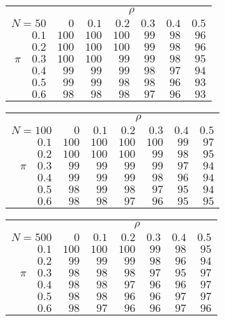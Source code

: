 \begin{tabular}{r|rrrrrr}
\hline\hline
 &\multicolumn{6}{c}{$\rho$} \\ 
 $N = 50$ & $0$ & $0.1$ & $0.2$ & $0.3$ & $0.4$ & $0.5$ \\ 
 \hline$0.1$ & $100$ & $100$ & $100$ & $99$ & $98$ & $96$\\ 
$0.2$ & $100$ & $100$ & $100$ & $99$ & $98$ & $96$\\ 
$\pi\quad$$0.3$ & $100$ & $100$ & $99$ & $99$ & $98$ & $95$\\ 
$0.4$ & $99$ & $99$ & $99$ & $98$ & $97$ & $94$\\ 
$0.5$ & $99$ & $99$ & $98$ & $98$ & $96$ & $93$\\ 
$0.6$ & $98$ & $98$ & $98$ & $97$ & $96$ & $93$\\ 
 \hline 
 \end{tabular}
 
 \vspace{2em} 
 
\begin{tabular}{r|rrrrrr}
\hline\hline
 &\multicolumn{6}{c}{$\rho$} \\ 
 $N = 100$ & $0$ & $0.1$ & $0.2$ & $0.3$ & $0.4$ & $0.5$ \\ 
 \hline$0.1$ & $100$ & $100$ & $100$ & $100$ & $99$ & $97$\\ 
$0.2$ & $100$ & $100$ & $100$ & $99$ & $98$ & $95$\\ 
$\pi\quad$$0.3$ & $99$ & $99$ & $99$ & $99$ & $97$ & $94$\\ 
$0.4$ & $99$ & $99$ & $99$ & $98$ & $96$ & $94$\\ 
$0.5$ & $98$ & $99$ & $98$ & $97$ & $95$ & $94$\\ 
$0.6$ & $98$ & $98$ & $97$ & $96$ & $95$ & $95$\\ 
 \hline 
 \end{tabular}
 
 \vspace{2em} 
 
\begin{tabular}{r|rrrrrr}
\hline\hline
 &\multicolumn{6}{c}{$\rho$} \\ 
 $N = 500$ & $0$ & $0.1$ & $0.2$ & $0.3$ & $0.4$ & $0.5$ \\ 
 \hline$0.1$ & $100$ & $100$ & $100$ & $99$ & $98$ & $95$\\ 
$0.2$ & $99$ & $99$ & $99$ & $98$ & $96$ & $94$\\ 
$\pi\quad$$0.3$ & $98$ & $98$ & $98$ & $97$ & $95$ & $97$\\ 
$0.4$ & $98$ & $98$ & $97$ & $96$ & $96$ & $97$\\ 
$0.5$ & $98$ & $98$ & $96$ & $96$ & $97$ & $97$\\ 
$0.6$ & $98$ & $97$ & $96$ & $96$ & $97$ & $96$\\ 
 \hline 
 \end{tabular}